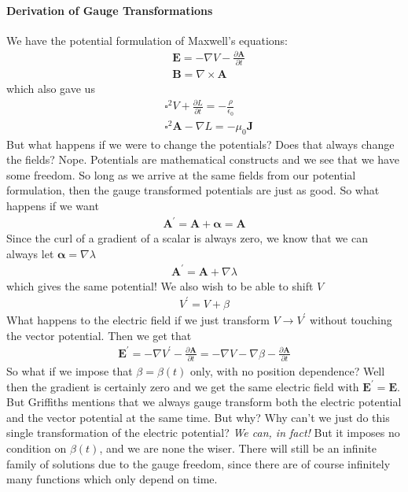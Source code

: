 \paragraph{Derivation of Gauge Transformations}
We have the potential formulation of Maxwell's equations:
\begin{align*}
    &\mathbf{E} = - \nabla V - \frac{\partial \mathbf{A}}{\partial t} \\
    &\mathbf{B} = \nabla \times \mathbf{A}
\end{align*}
which also gave us \begin{align*}
    &\square ^{2} V + \frac{\partial L}{\partial t} =  -\frac{\rho}{\epsilon _0}\\
    &\square ^{2} \mathbf{A} - \nabla L = -\mu _0 \mathbf{J}
\end{align*}
But what happens if we were to change the potentials? Does that always change the fields? Nope. Potentials are mathematical constructs and we see that we have some freedom. So long as we arrive at the same fields from our potential formulation, then the gauge transformed potentials are just as good. So what happens if we want \begin{align*}
    \mathbf{A}^{\prime}  = \mathbf{A} + \boldsymbol{\alpha} = \mathbf{A}
\end{align*}
Since the curl of a gradient of a scalar is always zero, we know that we can always let \(\boldsymbol{\alpha}  = \nabla \lambda \) \begin{align*}
    \mathbf{A}^{\prime} = \mathbf{A} + \nabla \lambda 
\end{align*}
which gives the same potential! We also wish to be able to shift \(V\) \begin{align*}
    V^{\prime} = V + \beta 
\end{align*}
What happens to the electric field if we just transform \(V \to V^{\prime} \) without touching the vector potential. Then we get that \begin{align*}
    \mathbf{E^{\prime} } = - \nabla V^{\prime} - \frac{\partial \mathbf{A}}{\partial t} = -\nabla V - \nabla \beta - \frac{\partial \mathbf{A}}{\partial t} 
\end{align*}
So what if we impose that \(\beta = \beta (t)\) only, with no position dependence? Well then the gradient is certainly zero and we get the same electric field with \(\mathbf{E}^{\prime} = \mathbf{E}\). But Griffiths mentions that we always gauge transform both the electric potential and the vector potential at the same time. But why? Why can't we just do this single transformation of the electric potential? \textit{We can, in fact!} But it imposes no condition on \(\beta (t)\), and we are none the wiser. There will still be an infinite family of solutions due to the gauge freedom, since there are of course infinitely many functions which only depend on time. 

